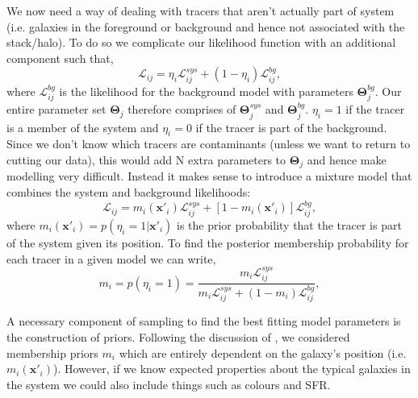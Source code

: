 We now need a way of dealing with tracers that aren't actually part of system (i.e. galaxies in the foreground or background and hence not associated with the stack/halo). To do so we complicate our likelihood function with an additional component such that, 
\begin{equation}
\mathcal{L}_{ij} = \eta_{i}\mathcal{L}^{sys}_{ij} + (1-\eta_i)\mathcal{L}_{ij}^{bg},
\end{equation}
where $\mathcal{L}^{bg}_{ij}$ is the likelihood for the background model with parameters $\boldsymbol{\Theta}^{bg}_{j}$. Our entire parameter set $\boldsymbol{\Theta}_{j}$ therefore comprises of $\boldsymbol{\Theta}^{sys}_{j}$ and $\boldsymbol{\Theta}^{bg}_{j}$. $\eta_{i} = 1$ if the tracer is a member of the system and $\eta_{i} = 0$ if the tracer is part of the background. Since we don't know which tracers are contaminants (unless we want to return to cutting our data), this would add N extra parameters to $\boldsymbol{\Theta}_{j}$ and hence make modelling very difficult. Instead it makes sense to introduce a mixture model that combines the system and background likelihoods:
\begin{equation}
\mathcal{L}_{ij} = m_{i}(\boldsymbol{x}'_{i})\mathcal{L}^{sys}_{ij} + [1 - m_{i}(\boldsymbol{x}'_{i})]\mathcal{L}^{bg}_{ij},
\end{equation}
where $m_{i}(\boldsymbol{x}'_{i}) = p(\eta_{i} = 1| \boldsymbol{x}'_{i})$ is the prior probability that the tracer is part of the system given its position. To find the posterior membership probability for each tracer in a given model we can write,
\begin{equation}
m_{i} = p(\eta_i = 1) = \frac{m_{i}\mathcal{L}_{ij}^{sys}}{m_{i}\mathcal{L}_{ij}^{sys} + (1 - m_i)\mathcal{L}^{bg}_{ij}},
\end{equation}

A necessary component of sampling to find the best fitting model parameters is the construction of priors. Following the discussion of \citet{watkins2013}, we considered membership priors $m_i$ which are entirely dependent on the galaxy's position (i.e. $m_{i}(\boldsymbol{x}'_{i})$). However, if we know expected properties about the typical galaxies in the system we could also include things such as colours and SFR. 

